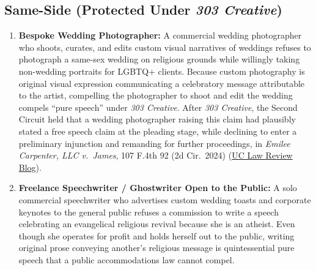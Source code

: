 \documentclass[12pt]{article}
\begin{document}
\subsection*{Same-Side (Protected Under \textit{303 Creative})}
\begin{enumerate}
  \item \textbf{Bespoke Wedding Photographer:} A commercial wedding photographer who shoots, curates, and edits custom visual narratives of weddings refuses to photograph a same-sex wedding on religious grounds while willingly taking non-wedding portraits for LGBTQ+ clients. Because custom photography is original visual expression communicating a celebratory message attributable to the artist, compelling the photographer to shoot and edit the wedding compels ``pure speech'' under \textit{303 Creative}. After \textit{303 Creative}, the Second Circuit held that a wedding photographer raising this claim had plausibly stated a free speech claim at the pleading stage, while declining to enter a preliminary injunction and remanding for further proceedings, in \textit{Emilee Carpenter, LLC v.\ James}, 107 F.4th 92 (2d Cir.\ 2024) (\href{https://uclawreview.org/2026/10/16/when-does-free-expression-end-and-discrimination-begin-an-analysis-of-how-lower-courts-have-applied-the-303-creative-llc-v-elenis-decision/}{UC Law Review Blog}).
  \item \textbf{Freelance Speechwriter / Ghostwriter Open to the Public:} A solo commercial speechwriter who advertises custom wedding toasts and corporate keynotes to the general public refuses a commission to write a speech celebrating an evangelical religious revival because she is an atheist. Even though she operates for profit and holds herself out to the public, writing original prose conveying another's religious message is quintessential pure speech that a public accommodations law cannot compel.
\end{enumerate}
\end{document}
